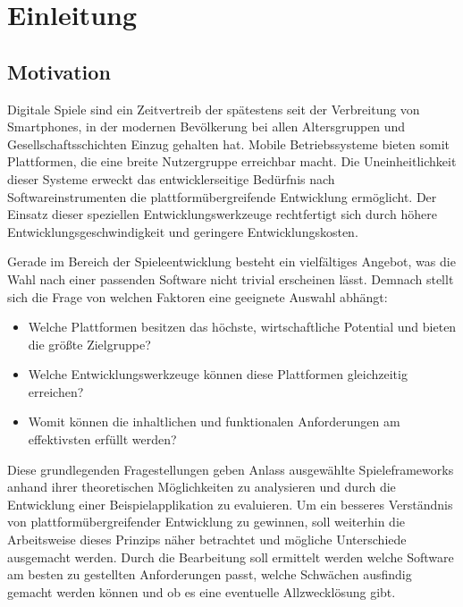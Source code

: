 
\chapter{Einleitung}

\section{Motivation}
Digitale Spiele sind ein Zeitvertreib der spätestens seit der Verbreitung von Smartphones, in der modernen Bevölkerung bei allen Altersgruppen und Gesellschaftsschichten Einzug gehalten hat. Mobile Betriebssysteme bieten somit Plattformen, die eine breite Nutzergruppe erreichbar macht. Die Uneinheitlichkeit dieser Systeme erweckt das entwicklerseitige Bedürfnis nach Softwareinstrumenten die plattformübergreifende Entwicklung ermöglicht. Der Einsatz dieser speziellen Entwicklungswerkzeuge rechtfertigt sich durch höhere Entwicklungsgeschwindigkeit und geringere Entwicklungskosten.

\bigskip
Gerade im Bereich der Spieleentwicklung besteht ein vielfältiges Angebot, was die Wahl nach einer passenden Software nicht trivial erscheinen lässt. Demnach stellt sich die Frage von welchen Faktoren eine geeignete Auswahl abhängt:

\begin{itemize}
	\item Welche Plattformen besitzen das höchste, wirtschaftliche Potential und bieten die größte Zielgruppe?
	\item Welche Entwicklungswerkzeuge können diese Plattformen gleichzeitig erreichen?
	\item Womit können die inhaltlichen und funktionalen Anforderungen am effektivsten erfüllt werden?
\end{itemize}

Diese grundlegenden Fragestellungen geben Anlass ausgewählte Spieleframeworks anhand ihrer theoretischen Möglichkeiten zu analysieren und durch die Entwicklung einer Beispielapplikation zu evaluieren. Um ein besseres Verständnis von plattformübergreifender Entwicklung zu gewinnen, soll weiterhin die Arbeitsweise dieses Prinzips näher betrachtet und mögliche Unterschiede ausgemacht werden. Durch die Bearbeitung soll ermittelt werden welche Software am besten zu gestellten Anforderungen passt, welche Schwächen ausfindig gemacht werden können und ob es eine eventuelle Allzwecklösung gibt.

